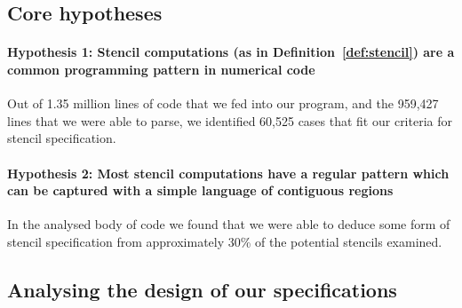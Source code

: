 \documentclass[10pt,preprint]{sigplanconf}
\theoremstyle{definition}
\begin{document}


\subsection{Core hypotheses}

\paragraph{Hypothesis 1: Stencil computations
(as in Definition~\ref{def:stencil}) are a common programming pattern
in numerical code}



Out of 1.35 million lines of code that we fed into our program, and
the 959,427 lines that we were able to parse, we identified 60,525
cases that fit our criteria for stencil specification.

\paragraph{Hypothesis 2: Most stencil computations
have a regular pattern which can be captured with a simple
language of contiguous regions}



In the analysed body of code we found that we were able to deduce
some form of stencil specification from approximately 30\% of the
potential stencils examined.


%
\subsection{Analysing the design of our specifications}

\end{document}
